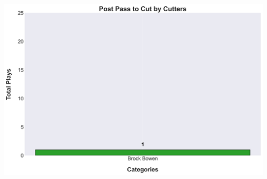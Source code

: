 \documentclass[a4paper,12pt]{article}
\begin{document}
\begin{table}[H]
{\begin{minipage}[t]{0.6\textwidth}
{\begin{tabular}
                
            
                
            
                
            
                
            
                
            
                
            
                
            
                
            
                
            
                
            
                
            
                
            
                
            
                
            
                
            
                
            
                
            
                
            

            \bottomrule
        \end{tabular}
        } %
    \end{minipage}
    } %
    \hfill %
    \begin{minipage}[c]{0.35\textwidth} %
        \flushright
        \includegraphics[width=\textwidth, height=.14\textheight]{images/Post_PassCutsPlayer_Freq.png} %
    \end{minipage}
\end{table}
\end{document}
